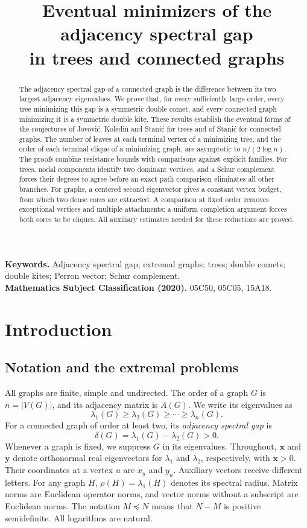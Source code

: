 \documentclass[11pt,a4paper]{article}
\title{\bfseries Eventual minimizers of the adjacency spectral gap\\in trees and connected graphs}
\author{}
\date{}
\numberwithin{equation}{section}
\theoremstyle{definition}
\theoremstyle{remark}
\begin{document}
\maketitle
\begin{abstract}
The adjacency spectral gap of a connected graph is the difference between
its two largest adjacency eigenvalues. We prove that, for every sufficiently
large order, every tree minimizing this gap is a symmetric double comet,
and every connected graph minimizing it is a symmetric double kite.
These results establish the eventual forms of the conjectures of
Jovovi\'c, Koledin and Stani\'c for trees and of Stani\'c for connected
graphs. The number of leaves at each terminal vertex of a minimizing
tree, and the order of each terminal clique of a minimizing graph, are
asymptotic to $n/(2\log n)$.
The proofs combine resistance bounds with comparisons against explicit
families. For trees, nodal components identify two dominant vertices, and
a Schur complement forces their degrees to agree before an exact path
comparison eliminates all other branches. For graphs, a centered second
eigenvector gives a constant vertex budget, from which two dense cores are
extracted. A comparison at fixed order removes exceptional vertices and
multiple attachments; a uniform completion argument forces both cores to
be cliques. All auxiliary estimates needed for these reductions are proved.
\end{abstract}
\noindent\textbf{Keywords.} Adjacency spectral gap; extremal graphs; trees;
double comets; double kites; Perron vector; Schur complement.\\
\textbf{Mathematics Subject Classification (2020).} 05C50, 05C05, 15A18.

\section{Introduction}

\subsection{Notation and the extremal problems}
All graphs are finite, simple and undirected. The order of a graph $G$ is
$n=|V(G)|$, and its adjacency matrix is $A(G)$. We write its eigenvalues as
\[
 \lambda_1(G)\ge\lambda_2(G)\ge\cdots\ge\lambda_n(G).
\]
For a connected graph of order at least two, its \emph{adjacency spectral
gap} is
\[
 \delta(G)=\lambda_1(G)-\lambda_2(G)>0.
\]
Whenever a graph is fixed, we suppress $G$ in its eigenvalues. Throughout,
$\mathbf{x}$ and $\mathbf{y}$ denote orthonormal real eigenvectors for
$\lambda_1$ and $\lambda_2$, respectively, with $\mathbf{x}>0$. Their
coordinates at a vertex $u$ are $x_u$ and $y_u$. Auxiliary vectors receive
different letters. For any graph $H$, $\rho(H)=\lambda_1(H)$ denotes its
spectral radius. Matrix norms are Euclidean operator norms, and vector
norms without a subscript are Euclidean norms. The notation $M\preceq N$
means that $N-M$ is positive semidefinite. All logarithms are natural.
\end{document}
